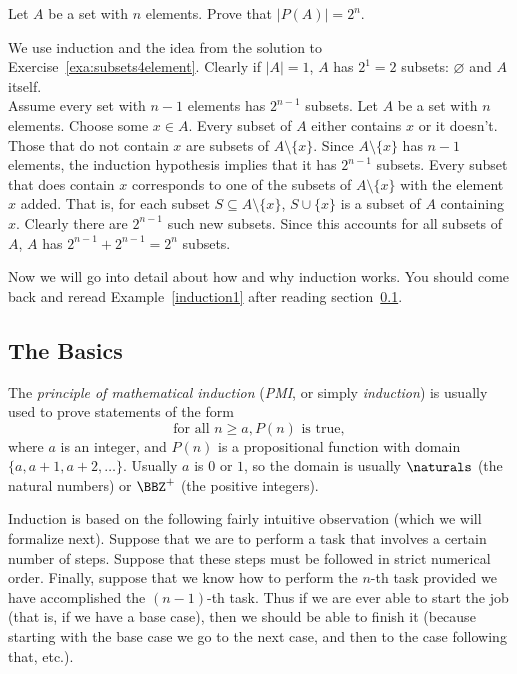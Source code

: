 \begin{exa}\label{induction1}
Let $A$ be a set with $n$ elements.  Prove that $|P(A)|=2^n$. 
\begin{pf}
We use induction and the idea from the solution to Exercise~\ref{exa:subsets4element}. 
Clearly if $|A|= 1$, $A$
has $2^1 = 2$ subsets: $\varnothing$ and $A$ itself.\\
Assume every
set with $n - 1$ elements has $2^{n-1}$ subsets. Let $A$ be a set
with $n$ elements.  Choose some $x\in A$.  Every subset of $A$
either contains $x$ or it doesn't.  
Those that do not contain $x$  are subsets of $A\setminus \{x\}$.  Since
$A\setminus \{x\}$ has $n - 1$ elements, the induction hypothesis implies that it has
$2^{n-1}$ subsets.
Every subset that does contain $x$ corresponds to one of the subsets of $A\setminus \{x\}$ with the element $x$ added.  That is, for each subset $S \subseteq A\setminus \{x\}$,  $S\cup \{x\}$ is a subset of $A$ containing $x$.
Clearly there are $2^{n-1}$ such new subsets.
Since this accounts for all subsets of $A$, $A$ has $2^{n-1} + 2^{n-1} = 2^n$ subsets.  
\end{pf}
\end{exa}

Now we will go into detail about how and why induction works.
You should come back and reread Example~\ref{induction1} 
after reading section~\ref{sec:indBasic}.

\subsection{The Basics}\label{sec:indBasic}
The {\em principle of mathematical induction} 
({\em PMI}, or simply {\em induction}) is usually used to 
prove statements of the form 
$$\mbox{for all } n\geq a, P(n) \mbox{ is true},$$  
where $a$ is an integer,
and $P(n)$ is a propositional function with domain $\{a, a+1, a+2,\ldots\}$. 
Usually $a$ is $0$ or $1$,
so the domain is usually $\naturals$ (the natural numbers) or $\BBZ^+$
(the positive integers).


Induction is based on the following
fairly intuitive observation (which we will formalize next). Suppose that we are to perform a
task that involves a certain number of steps. Suppose that these
steps must be followed in strict numerical order. Finally, suppose
that we know how to perform the $n$-th task provided we have
accomplished the $(n - 1)$-th task. Thus if we are ever able to
start the job (that is, if we have a base case), then we should be
able to finish it (because starting with the base case we go to
the next case, and then to the case following that, etc.).

